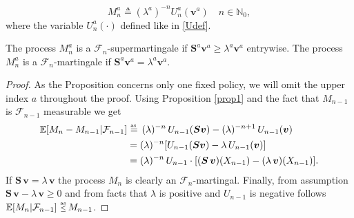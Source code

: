 \begin{equation}
\label{Mdef} 
M_{n}^{a}\triangleq(\lambda^a)^{-n}U_n^a(\bm{v}^a) \quad n\in\mathbb{N}_0,
\end{equation}
where the variable $U_n^{a}(\cdot)$ defined like in \eqref{Udef}.
\begin{prop}
\label{Mlem}
The process $M_{n}^{a}$ is a $\mathcal{F}_n$-supermartingale if $\bm{S}^a\bm{v}^a\geq\lambda^a\bm{v}^a$ entrywise. The process $M_{n}^{a}$ is a $\mathcal{F}_n$-martingale if $\bm{S}^a\bm{v}^a=\lambda^a\bm{v}^a$.
\end{prop}
\begin{proof}
As the Proposition concerns only one fixed policy, we will omit the upper index $a$ throughout the proof. Using Proposition \ref{prop1} and the fact that $M_{n-1}$ is $\mathcal{F}_{n-1}$ measurable we get
\begin{align*}
\mathbb{E}[M_n-M_{n-1}|\mathcal{F}_{n-1}]&\aseq(\lambda)^{-n}\,U_{n-1}(\bm{S}\bm{v}) - (\lambda)^{-n+1}\,U_{n-1}(\bm{v})\\
&=(\lambda)^{-n}[U_{n-1}(\bm{S}\bm{v})-\lambda\,U_{n-1}(\bm{v})]\\
&=(\lambda)^{-n}\,U_{n-1}\cdot[(\bm{S}\,\bm{v})(X_{n-1})-(\lambda\,\bm{v})(X_{n-1})].
\end{align*}
If $\bm{S}\,\bm{v}=\lambda\,\bm{v}$ the process $M_{n}$ is clearly an $\mathcal{F}_n$-martingal. Finally, from assumption $\bm{S}\,\bm{v}-\lambda\,\bm{v}\geq0$ and from facts that $\lambda$ is positive and $U_{n-1}$ is negative follows $\mathbb{E}[M_n|\mathcal{F}_{n-1}]\asleq M_{n-1}$. 
\end{proof}

